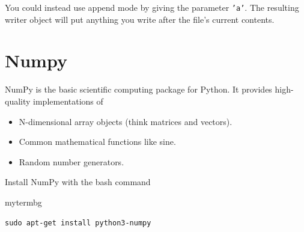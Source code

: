 You could instead use append mode by giving the parameter \texttt{'a'}.
The resulting writer object will put anything you write after the file's current contents.

\section{Numpy}
NumPy is the basic scientific computing package for Python.
It provides high-quality implementations of
\begin{itemize}
    \item N-dimensional array objects (think matrices and vectors).
    \item Common mathematical functions like sine.
    \item Random number generators.
\end{itemize}
Install NumPy with the bash command
\begin{tsession}{mytermbg}
\begin{verbatim}
sudo apt-get install python3-numpy
\end{verbatim}
\end{tsession}
